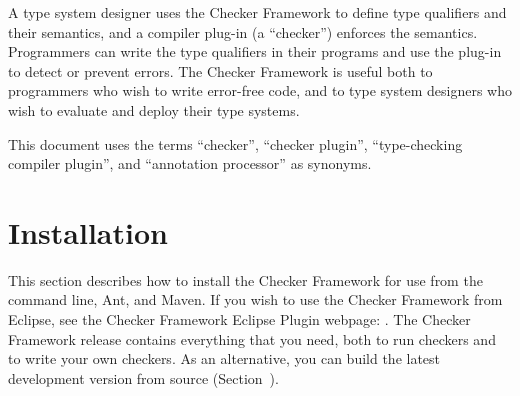 A type system designer uses the Checker Framework to define type qualifiers
and their semantics, and a
compiler plug-in (a ``checker'') enforces the semantics.  Programmers can
write the type qualifiers in their programs and use the plug-in to detect
or prevent errors.  The Checker Framework is useful both to programmers who
wish to write error-free code, and to type system designers who wish to
evaluate and deploy their type systems.









This document uses the terms ``checker'', ``checker plugin'',
``type-checking compiler plugin'', and ``annotation processor'' as
synonyms.

\section{Installation\label{installation}}

This section describes how to install the Checker
Framework for use from the command line, Ant, and Maven.  If you wish to
use the Checker Framework from Eclipse, see the Checker Framework Eclipse
Plugin webpage: .
The Checker Framework release contains everything that you need, both to
run checkers and to write your own checkers.  As an alternative, you can
build the latest development version from source
(Section~).

